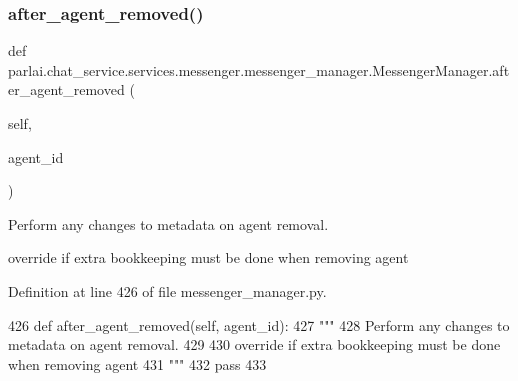 \subsubsection{\texorpdfstring{after\+\_\+agent\+\_\+removed()}{after\_agent\_removed()}}
{\footnotesize\ttfamily def parlai.\+chat\+\_\+service.\+services.\+messenger.\+messenger\+\_\+manager.\+Messenger\+Manager.\+after\+\_\+agent\+\_\+removed (\begin{DoxyParamCaption}\item[{}]{self,  }\item[{}]{agent\+\_\+id }\end{DoxyParamCaption})}

\begin{DoxyVerb}Perform any changes to metadata on agent removal.

override if extra bookkeeping must be done when removing agent
\end{DoxyVerb}
 

Definition at line 426 of file messenger\+\_\+manager.\+py.


\begin{DoxyCode}
426     \textcolor{keyword}{def }after\_agent\_removed(self, agent\_id):
427         \textcolor{stringliteral}{"""}
428 \textcolor{stringliteral}{        Perform any changes to metadata on agent removal.}
429 \textcolor{stringliteral}{}
430 \textcolor{stringliteral}{        override if extra bookkeeping must be done when removing agent}
431 \textcolor{stringliteral}{        """}
432         \textcolor{keywordflow}{pass}
433 
\end{DoxyCode}
\mbox{\label{classparlai_1_1chat__service_1_1services_1_1messenger_1_1messenger__manager_1_1MessengerManager_ace19c32e618503b0b750f3e0a5641f4d}} 

